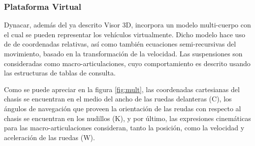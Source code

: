 \begin{table}[H]
  \centering
{}%
  \caption{Sensores y dispositivos electrónicos}
  \label{tab:sen}%
\end{table}%

\subsubsection{Plataforma Virtual}

Dynacar, además del ya descrito Visor 3D, incorpora un modelo multi-cuerpo \cite{cuadrado2013multibody} con el cual se pueden representar los vehículos virtualmente. Dicho modelo hace uso de de coordenadas relativas, así como también ecuaciones semi-recursivas del movimiento, basado en la transformación de la velocidad. Las suspensiones son consideradas como macro-articulaciones, cuyo comportamiento es descrito usando las estructuras de tablas de consulta.\\ 

\par Como se puede apreciar en la figura \ref{fig:mult}, las coordenadas cartesianas del chasis se encuentran en el medio del ancho de las ruedas delanteras (C), los ángulos de navegación  que proveen la orientación de las reudas con respecto al chasis se encuentran en los nudillos (K), y por último, las expresiones cinemáticas para las macro-articulaciones consideran, tanto la posición, como la velocidad y aceleración de las ruedas (W).\\

